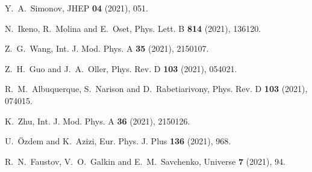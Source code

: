 \documentclass[preprint,12pt,3p]{elsarticle}
\begin{document}
\begin{thebibliography}{99}
Y.~A.~Simonov,
JHEP \textbf{04} (2021), 051.

N.~Ikeno, R.~Molina and E.~Oset,
Phys. Lett. B \textbf{814} (2021), 136120.

Z.~G.~Wang,
Int. J. Mod. Phys. A \textbf{35} (2021), 2150107.

Z.~H.~Guo and J.~A.~Oller,
Phys. Rev. D \textbf{103} (2021), 054021.

R.~M.~Albuquerque, S.~Narison and D.~Rabetiarivony,
Phys. Rev. D \textbf{103} (2021), 074015.

K.~Zhu,
Int. J. Mod. Phys. A \textbf{36} (2021), 2150126.

U.~\"Ozdem and K.~Azizi,
Eur. Phys. J. Plus \textbf{136}  (2021), 968.


R.~N.~Faustov, V.~O.~Galkin and E.~M.~Savchenko,
Universe \textbf{7} (2021), 94.


\end{thebibliography}
\end{document}
